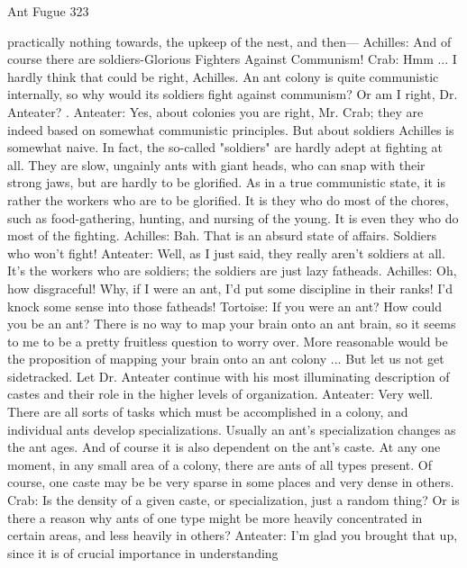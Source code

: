 Ant Fugue                                                                                323

    practically nothing towards, the upkeep of the nest, and then—
Achilles: And of course there are soldiers-Glorious Fighters Against Communism!
Crab: Hmm ... I hardly think that could be right, Achilles. An ant colony is quite
    communistic internally, so why would its soldiers fight against communism? Or am I
    right, Dr. Anteater? .
Anteater: Yes, about colonies you are right, Mr. Crab; they are indeed based on
    somewhat communistic principles. But about soldiers Achilles is somewhat naive. In
    fact, the so-called "soldiers" are hardly adept at fighting at all. They are slow,
    ungainly ants with giant heads, who can snap with their strong jaws, but are hardly to
    be glorified. As in a true communistic state, it is rather the workers who are to be
    glorified. It is they who do most of the chores, such as food-gathering, hunting, and
    nursing of the young. It is even they who do most of the fighting.
Achilles: Bah. That is an absurd state of affairs. Soldiers who won't fight!
Anteater: Well, as I just said, they really aren't soldiers at all. It's the workers who are
    soldiers; the soldiers are just lazy fatheads.
Achilles: Oh, how disgraceful! Why, if I were an ant, I'd put some discipline in their
    ranks! I'd knock some sense into those fatheads!
Tortoise: If you were an ant? How could you be an ant? There is no way to map your
    brain onto an ant brain, so it seems to me to be a pretty fruitless question to worry
    over. More reasonable would be the proposition of mapping your brain onto an ant
    colony ... But let us not get sidetracked. Let Dr. Anteater continue with his most
    illuminating description of castes and their role in the higher levels of organization.
Anteater: Very well. There are all sorts of tasks which must be accomplished in a colony,
    and individual ants develop specializations. Usually an ant's specialization changes as
    the ant ages. And of course it is also dependent on the ant's caste. At any one
    moment, in any small area of a colony, there are ants of all types present. Of course,
    one caste may be be very sparse in some places and very dense in others.
Crab: Is the density of a given caste, or specialization, just a random thing? Or is there a
    reason why ants of one type might be more heavily concentrated in certain areas, and
    less heavily in others?
Anteater: I'm glad you brought that up, since it is of crucial importance in understanding
